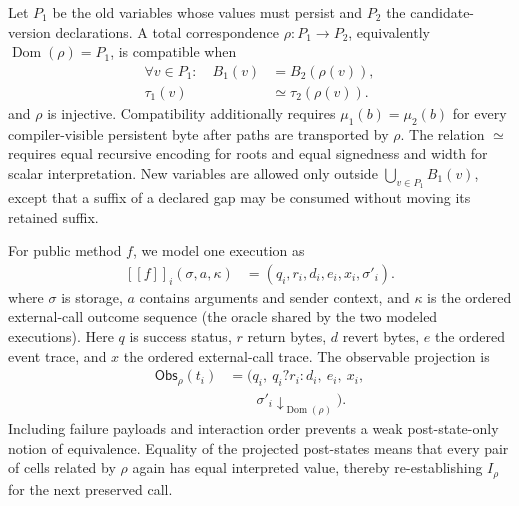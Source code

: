 \documentclass[runningheads]{llncs}
\newcommand{\sem}[1]{[\![#1]\!]}
\newcommand{\obs}{\mathsf{Obs}}
\begin{document}
Let \(P_1\) be the old variables whose values must persist and \(P_2\) the candidate-version declarations.  A total correspondence \(\rho:P_1\rightarrow P_2\), equivalently \(\operatorname{Dom}(\rho)=P_1\), is compatible when
\begin{equation}
\begin{aligned}
\forall v\in P_1:\quad
B_1(v)&=B_2(\rho(v)),\\
\tau_1(v)&\simeq\tau_2(\rho(v)).
\end{aligned}
\label{eq:layout-compatible}
\end{equation}
and \(\rho\) is injective.  Compatibility additionally requires \(\mu_1(b)=\mu_2(b)\) for every compiler-visible persistent byte after paths are transported by \(\rho\).  The relation \(\simeq\) requires equal recursive encoding for roots and equal signedness and width for scalar interpretation. New variables are allowed only outside \(\bigcup_{v\in P_1}B_1(v)\), except that a suffix of a declared gap may be consumed without moving its retained suffix.

For public method \(f\), we model one execution as
\begin{equation}
\begin{aligned}
\sem{f}_{i}(\sigma,a,\kappa)
&=(q_i,r_i,d_i,e_i,x_i,\sigma'_i).
\end{aligned}
\label{eq:transition}
\end{equation}
where \(\sigma\) is storage, \(a\) contains arguments and sender context, and \(\kappa\) is the ordered external-call outcome sequence (the oracle shared by the two modeled executions).  Here \(q\) is success status, \(r\) return bytes, \(d\) revert bytes, \(e\) the ordered event trace, and \(x\) the ordered external-call trace.  The observable projection is
\begin{equation}
\begin{aligned}
\obs_\rho(t_i)
&=\bigl(q_i,\ q_i?r_i:d_i,\ e_i,\ x_i,\\
&\qquad \sigma'_i\!\downarrow_{\operatorname{Dom}(\rho)}\bigr).
\end{aligned}
\label{eq:observation}
\end{equation}
Including failure payloads and interaction order prevents a weak post-state-only notion of equivalence.  Equality of the projected post-states means that every pair of cells related by \(\rho\) again has equal interpreted value, thereby re-establishing \(I_\rho\) for the next preserved call.
\end{document}
